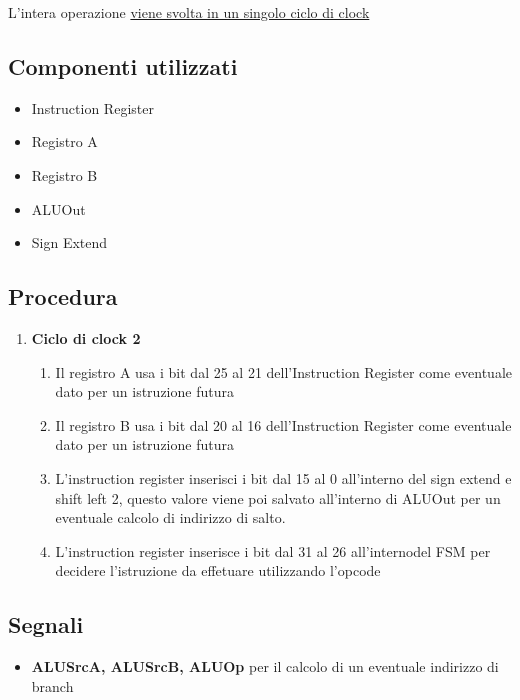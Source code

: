 L'intera operazione \uline{viene svolta in un singolo ciclo di clock}

\subsection{Componenti utilizzati}
\begin{itemize}
    \item Instruction Register
    \item Registro A
    \item Registro B
    \item ALUOut
    \item Sign Extend
\end{itemize}


\subsection{Procedura}
\begin{enumerate}
    \item[2.] \textbf{Ciclo di clock 2}
        \begin{enumerate}[label=\theenumi.\arabic*]
            \item [2.1] Il registro A usa i bit dal 25 al 21 dell'Instruction Register come eventuale dato per un istruzione futura
            \item [2.2] Il registro B usa i bit dal 20 al 16 dell'Instruction Register come eventuale dato per un istruzione futura
            \item [2.3] L'instruction register inserisci i bit dal 15 al 0 all'interno del sign extend e shift left 2, questo valore viene poi salvato all'interno di ALUOut per un eventuale calcolo di indirizzo di salto.
            \item [2.4] L'instruction register inserisce i bit dal 31 al 26 all'internodel FSM per decidere l'istruzione da effetuare utilizzando l'opcode
        \end{enumerate}
\end{enumerate}

\subsection{Segnali}
\begin{itemize}
    \item \textbf{ALUSrcA, ALUSrcB, ALUOp} per il calcolo di un eventuale indirizzo di branch
\end{itemize}

